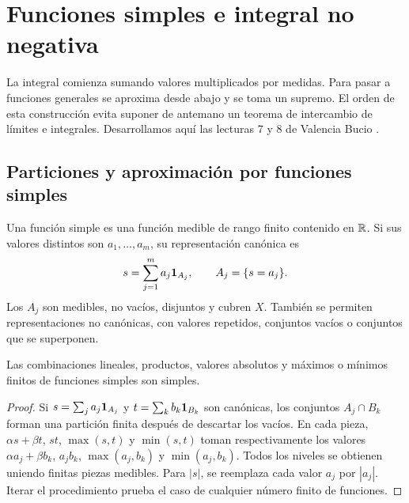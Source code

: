 \chapter{Funciones simples e integral no negativa}\label{cap:v2-04}
La integral comienza sumando valores multiplicados por medidas. Para pasar a funciones generales se aproxima desde abajo y se toma un supremo. El orden de esta construcción evita suponer de antemano un teorema de intercambio de límites e integrales. Desarrollamos aquí las lecturas 7 y 8 de Valencia Bucio \cite{valencia2}.

\section{Particiones y aproximación por funciones simples}\label{lectura:v2-07}
\begin{definicion}
Una función simple es una función medible de rango finito contenido en $\mathbb R$. Si sus valores distintos son $a_1,\ldots,a_m$, su representación canónica es
\[s=\sum_{j=1}^ma_j\mathbf1_{A_j},\qquad A_j=\{s=a_j\}.\]
Los $A_j$ son medibles, no vacíos, disjuntos y cubren $X$. También se permiten representaciones no canónicas, con valores repetidos, conjuntos vacíos o conjuntos que se superponen.
\end{definicion}
\begin{proposicion}
Las combinaciones lineales, productos, valores absolutos y máximos o mínimos finitos de funciones simples son simples.
\end{proposicion}
\begin{proof}
Si $s=\sum_ja_j\mathbf1_{A_j}$ y $t=\sum_kb_k\mathbf1_{B_k}$ son canónicas, los conjuntos $A_j\cap B_k$ forman una partición finita después de descartar los vacíos. En cada pieza, $\alpha s+\beta t$, $st$, $\max(s,t)$ y $\min(s,t)$ toman respectivamente los valores $\alpha a_j+\beta b_k$, $a_jb_k$, $\max(a_j,b_k)$ y $\min(a_j,b_k)$. Todos los niveles se obtienen uniendo finitas piezas medibles. Para $|s|$, se reemplaza cada valor $a_j$ por $|a_j|$. Iterar el procedimiento prueba el caso de cualquier número finito de funciones.
\end{proof}

